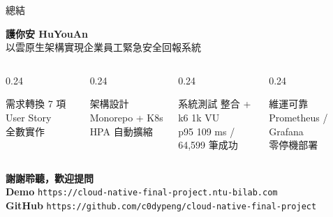 \documentclass[aspectratio=169,12pt]{beamer}
\begin{document}
\begin{frame}[shrink=15]{總結}
\begin{center}
  {\Large\bfseries 護你安 HuYouAn}\\[0.4cm]
  {\normalsize 以雲原生架構實現企業員工緊急安全回報系統}
\end{center}
\vspace{0.3cm}
\begin{columns}[T,onlytextwidth]
\begin{column}{0.24\textwidth}
  \begin{block}{\centering 需求轉換}
    \centering\small 7 項 User Story\\全數實作
  \end{block}
\end{column}
\begin{column}{0.24\textwidth}
  \begin{block}{\centering 架構設計}
    \centering\small Monorepo + K8s\\HPA 自動擴縮
  \end{block}
\end{column}
\begin{column}{0.24\textwidth}
  \begin{block}{\centering 系統測試}
    \centering\small 整合 + k6 1k VU\\p95 109 ms / 64,599 筆成功
  \end{block}
\end{column}
\begin{column}{0.24\textwidth}
  \begin{block}{\centering 維運可靠}
    \centering\small Prometheus / Grafana\\零停機部署
  \end{block}
\end{column}
\end{columns}
\vspace{0.4cm}
\begin{center}
  {\large\bfseries\color{mprimary} 謝謝聆聽，歡迎提問}\\[0.3cm]
  \small
  \textcolor{mprimary!60}{\textbf{Demo}} \enspace
  \texttt{\small https://cloud-native-final-project.ntu-bilab.com}\\[0.1cm]
  \textcolor{mprimary!60}{\textbf{GitHub}} \enspace
  \texttt{\small https://github.com/c0dypeng/cloud-native-final-project}
\end{center}
\end{frame}
\end{document}
